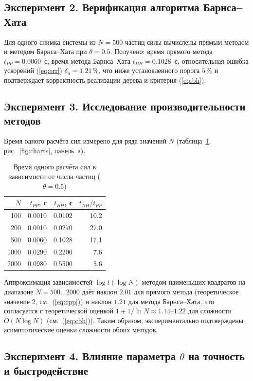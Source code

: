 \documentclass[12pt,a4paper]{article}
\begin{document}
	\subsection{Эксперимент 2. Верификация алгоритма Барнса--Хата}
	
	Для одного снимка системы из $N = 500$ частиц силы вычислены прямым методом и методом Барнса--Хата при $\theta = 0.5$. Получено: время прямого метода $t_{PP} = 0.0060$~с, время метода Барнса--Хата $t_{BH} = 0.1028$~с, относительная ошибка ускорений (\ref{eq:err}) $\delta_a = 1.21\,\%$, что ниже установленного порога $5\,\%$ и подтверждает корректность реализации дерева и критерия (\ref{eq:bh}).
	
	\subsection{Эксперимент 3. Исследование производительности методов}
	
	Время одного расчёта сил измерено для ряда значений $N$ (таблица~\ref{tab:time}, рис.~\ref{fig:charts}, панель~а).
	
	\begin{table}[h]
		\centering
		\caption{Время одного расчёта сил в зависимости от числа частиц ($\theta = 0.5$)}
		\label{tab:time}
		\begin{tabular}{rrrr}
			\toprule
			$N$ & $t_{PP}$, с & $t_{BH}$, с & $t_{BH}/t_{PP}$ \\
			\midrule
			100  & 0.0010 & 0.0102 & 10.2 \\
			200  & 0.0010 & 0.0270 & 27.0 \\
			500  & 0.0060 & 0.1028 & 17.1 \\
			1000 & 0.0290 & 0.2200 & 7.6 \\
			2000 & 0.0980 & 0.5500 & 5.6 \\
			\bottomrule
		\end{tabular}
	\end{table}
	
	Аппроксимация зависимостей $\log t(\log N)$ методом наименьших квадратов на диапазоне $N = 500 \dots 2000$ даёт наклон $2.01$ для прямого метода (теоретическое значение 2, см.~(\ref{eq:cpp})) и наклон $1.21$ для метода Барнса--Хата, что согласуется с теоретической оценкой $1 + 1/\ln N \approx 1.14\text{--}1.22$ для сложности $O(N\log N)$ (см.~(\ref{eq:cbh})). Таким образом, экспериментально подтверждены асимптотические оценки сложности обоих методов.
	
	\subsection{Эксперимент 4. Влияние параметра $\theta$ на точность и быстродействие}
	
\end{document}
